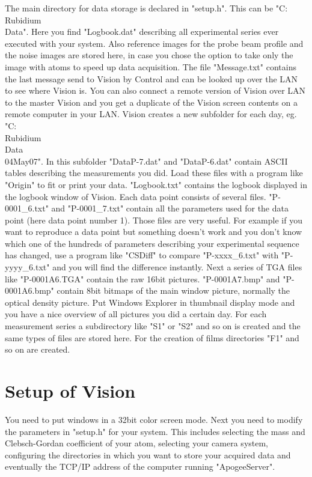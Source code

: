 \documentclass[10pt]{article}
\begin{document}
The main directory for data storage is declared in "setup.h". This
can be "C:\\Rubidium\\Data". Here you find "Logbook.dat"
describing all experimental series ever executed with your system.
Also reference images for the probe beam profile and the noise
images are stored here, in case you chose the option to take only
the image with atoms to speed up data acquisition. The file
"Message.txt" contains the last message send to Vision by Control
and can be looked up over the LAN to see where Vision is. You can
also connect a remote version of Vision over LAN to the master
Vision and you get a duplicate of the Vision screen contents on a
remote computer in your LAN. Vision creates a new subfolder for
each day, eg. "C:\\Rubidium\\Data\\04May07". In this subfolder
"DataP-7.dat" and "DataP-6.dat" contain ASCII tables describing
the measurements you did. Load these files with a program like
"Origin" to fit or print your data. "Logbook.txt" contains the
logbook displayed in the logbook window of Vision. Each data point
consists of several files. "P-0001\_6.txt" and "P-0001\_7.txt"
contain all the parameters used for the data point (here data
point number 1). Those files are very useful. For example if you
want to reproduce a data point but something doesn't work and you
don't know which one of the hundreds of parameters describing your
experimental sequence has changed, use a program like "CSDiff" to
compare "P-xxxx\_6.txt" with "P-yyyy\_6.txt" and you will find the
difference instantly. Next a series of TGA files like
"P-0001A6.TGA" contain the raw 16bit pictures. "P-0001A7.bmp" and
"P-0001A6.bmp" contain 8bit bitmaps of the main window picture,
normally the optical density picture. Put Windows Explorer in
thumbnail display mode and you have a nice overview of all
pictures you did a certain day. For each measurement series a
subdirectory like "S1" or "S2" and so on is created and the same
types of files are stored here. For the creation of films
directories "F1" and so on are created.

\section{Setup of Vision}

You need to put windows in a 32bit color screen mode. Next you
need to modify the parameters in "setup.h" for your system. This
includes selecting the mass and Clebsch-Gordan coefficient of your
atom, selecting your camera system, configuring the directories in
which you want to store your acquired data and eventually the
TCP/IP address of the computer running "ApogeeServer".
\end{document}
